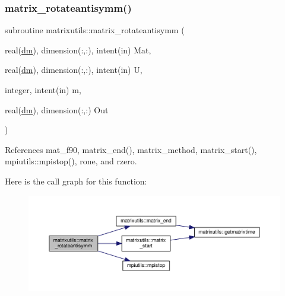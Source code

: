 \subsubsection{\texorpdfstring{matrix\+\_\+rotateantisymm()}{matrix\_rotateantisymm()}}
{\footnotesize\ttfamily subroutine matrixutils\+::matrix\+\_\+rotateantisymm (\begin{DoxyParamCaption}\item[{real(\mbox{\hyperlink{namespacematrixutils_a7bdc564986ea4d90f51201c75606ef3d}{dm}}), dimension(\+:,\+:), intent(in)}]{Mat,  }\item[{real(\mbox{\hyperlink{namespacematrixutils_a7bdc564986ea4d90f51201c75606ef3d}{dm}}), dimension(\+:,\+:), intent(in)}]{U,  }\item[{integer, intent(in)}]{m,  }\item[{real(\mbox{\hyperlink{namespacematrixutils_a7bdc564986ea4d90f51201c75606ef3d}{dm}}), dimension(\+:,\+:)}]{Out }\end{DoxyParamCaption})}



References mat\+\_\+f90, matrix\+\_\+end(), matrix\+\_\+method, matrix\+\_\+start(), mpiutils\+::mpistop(), rone, and rzero.

Here is the call graph for this function\+:
\nopagebreak
\begin{figure}[H]
\begin{center}
\leavevmode
\includegraphics[width=350pt]{namespacematrixutils_a6e5b7eb3ff08d14994be069ca192ea48_cgraph}
\end{center}
\end{figure}
\mbox{\label{namespacematrixutils_aec8c0f5500ce3fccc5a427276bbc95d2}} 
